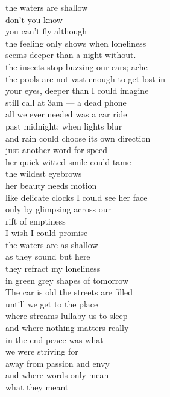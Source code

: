 the waters are shallow\\
don't you know\\
you can't fly although\\
the feeling only shows when loneliness\\
seems deeper than a  night without.-- \\
the insects stop buzzing our ears; ache\\
the pools are not vast enough to get lost in\\
your eyes, deeper than I could  imagine\\
still call at 3am --- a dead phone\\
all we ever needed was a car ride\\
past midnight; when lights blur\\
and rain  could choose its own direction\\
just another word for speed\\
her quick witted smile could tame\\
the wildest eyebrows\\

her beauty needs  motion\\
like delicate clocks I could see her face\\
only by glimpsing across our\\
rift of emptiness\\
I wish I could promise\\
the waters are as shallow\\
as they sound but here\\
they refract my loneliness\\
in green grey shapes of tomorrow\\

The car is old the streets are filled\\
untill we get to the place\\
where streams lullaby us to sleep\\
and where nothing matters really\\
in the end peace was what\\
we were striving for\\
away from passion and envy\\
and where words only mean\\
what they meant

